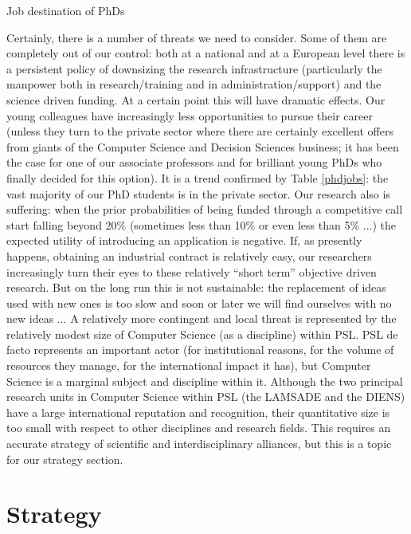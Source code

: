\begin{table}
  \centering
  \caption{Job destination of PhDs}\label{phdjobs}
\end{table}

Certainly, there is a number of threats we need to consider. Some of them are completely out of our control: both at a national and at a European level there is a persistent policy of downsizing the research infrastructure (particularly the manpower both in research/training and in administration/support) and the science driven funding. At a certain point this will have dramatic effects. Our young colleagues have increasingly less opportunities to pursue their career (unless they turn to the private sector where there are certainly excellent offers from giants of the Computer Science and Decision Sciences business; it has been the case for one of our associate professors and for brilliant young PhDs who finally decided for this option). It is a trend confirmed by Table \ref{phdjobs}: the vast majority of our PhD students is in the private sector. Our research also is suffering: when the prior probabilities of being funded through a competitive call start falling beyond 20\% (sometimes less than 10\% or even less than 5\% ...) the expected utility of introducing an application is negative. If, as presently happens, obtaining an industrial contract is relatively easy, our researchers increasingly turn their eyes to these relatively ``short term'' objective driven research. But on the long run this is not sustainable: the replacement of ideas used with new ones is too slow and soon or later we will find ourselves with no new ideas ... A relatively more contingent and local threat is represented by the relatively modest size of Computer Science (as a discipline) within PSL. PSL de facto represents an important actor (for institutional reasons, for the volume of resources they manage, for the international impact it has), but Computer Science is a marginal subject and discipline within it. Although the two principal research units in Computer Science within PSL (the LAMSADE and the DIENS) have a large international reputation and recognition, their quantitative size is too small with respect to other disciplines and research fields. This requires an accurate strategy of scientific and interdisciplinary alliances, but this is a topic for our strategy section.

\section{Strategy}\label{strategy}

